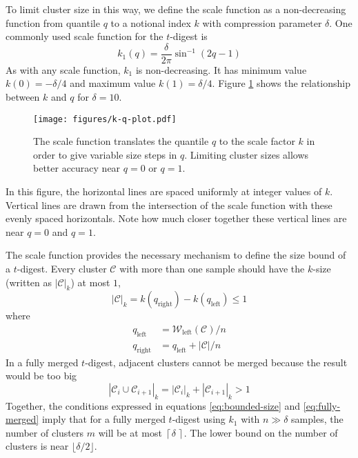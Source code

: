 \documentclass[]{statsoc}
\begin{document}
To limit cluster size in this way, we define the scale function as a non-decreasing function from quantile $q$ to a notional index $k$ with compression parameter $\delta$. One commonly used  scale function for the $t$-digest is 
\begin{equation}
k_1(q) = \frac \delta {2\pi}  { {\sin^{-1} (2q-1)} }    
\end{equation}
As with any scale function, $k_1$ is non-decreasing. It has minimum value  $k(0)=-\delta/4$ and maximum value  $k(1)=\delta/4$.  Figure \ref{fig:k-q-plot} shows the relationship between $k$ and $q$ for $\delta=10$. 
\begin{figure}[htbp] %
   \centering
   \texttt{[image: figures/k-q-plot.pdf]} 
   \caption{The scale function translates the quantile $q$ to the scale factor $k$ in order to give variable size steps in $q$. Limiting cluster sizes allows better accuracy near $q=0$ or $q=1$. }
   \label{fig:k-q-plot}
\end{figure}
In this figure, the horizontal lines are spaced uniformly at integer values of $k$. Vertical lines are drawn from the intersection of the scale function with these evenly spaced horizontals. Note how much closer together these vertical lines are near $q=0$ and $q=1$.

The scale function provides the necessary mechanism to define the size bound of a $t$-digest. Every cluster $\mathcal C$ with more than one sample should have the $k$-size (written as $|\mathcal C|_k$) at most $1$,
\begin{equation}
\label{eq:bounded-size}
|\mathcal C|_k = k \left (q_{\mathrm {right}} \right) - k \left ( q_{\mathrm {left}} \right) \le 1
\end{equation}
where
\begin{align*}
q_{\mathrm {left}} &= {\mathcal W}_{\mathrm{left}}(\mathcal C)/n \\
q_{\mathrm {right}} &= q_{\mathrm {left}} + {| \mathcal C | / n} 
\end{align*}
In a fully merged $t$-digest, adjacent clusters cannot be merged because the result would be too big 
\begin{equation}
\label{eq:fully-merged}
|\mathcal C_i \cup \mathcal C_{i+1} |_k = |\mathcal C_i|_k + |\mathcal C_{i+1}|_k > 1
\end{equation}
Together, the conditions expressed in equations \ref{eq:bounded-size} and \ref{eq:fully-merged} imply that for a fully merged $t$-digest using $k_1$ with $n \gg \delta$ samples, the number of clusters $m$ will be at most $ \left \lceil\delta \,\right \rceil $.  The lower bound  on the number of clusters is near $ \lfloor\delta/2\rfloor $.
\end{document}
